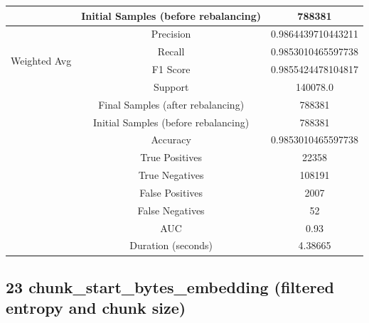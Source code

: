 \begin{longtable}{|c|c|c|}
 & Initial Samples (before rebalancing) & 788381 \\
\hline
\multirow{4}{*}{Weighted Avg} & Precision & 0.9864439710443211 \\
 & Recall & 0.9853010465597738 \\
 & F1 Score & 0.9855424478104817 \\
 & Support & 140078.0 \\
 & Final Samples (after rebalancing) & 788381 \\
 & Initial Samples (before rebalancing) & 788381 \\
\hline
& Accuracy & 0.9853010465597738 \\ \hline
& True Positives & 22358 \\ \hline
& True Negatives & 108191 \\ \hline
& False Positives & 2007 \\ \hline
& False Negatives & 52 \\ \hline
& AUC & 0.93 \\ \hline
& Duration (seconds) & 4.38665 \\ \hline
\end{longtable}


\subsection{23 chunk\_start\_bytes\_embedding (filtered entropy and chunk size)}

